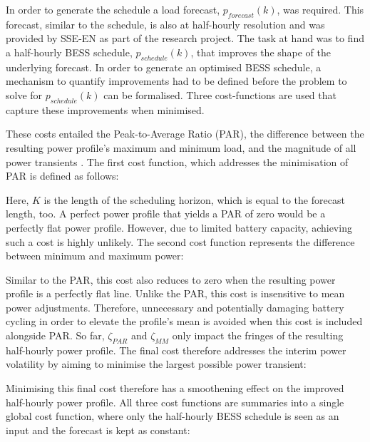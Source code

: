 In order to generate the schedule a load forecast, $p_{forecast}(k)$, was required.
This forecast, similar to the schedule, is also at half-hourly resolution and was provided by SSE-EN as part of the research project.
The task at hand was to find a half-hourly BESS schedule, $p_{schedule}(k)$, that improves the shape of the underlying forecast.
In order to generate an optimised BESS schedule, a mechanism to quantify improvements had to be defined before the problem to solve for $p_{schedule}(k)$ can be formalised.
Three cost-functions are used that capture these improvements when minimised.

These costs entailed the Peak-to-Average Ratio (PAR), the difference between the resulting power profile's maximum and minimum load, and the magnitude of all power transients \cite{Mohsenian-Rad2010, Mostafa2016}.
The first cost function, which addresses the minimisation of PAR is defined as follows:



Here, $K$ is the length of the scheduling horizon, which is equal to the forecast length, too.
A perfect power profile that yields a PAR of zero would be a perfectly flat power profile.
However, due to limited battery capacity, achieving such a cost is highly unlikely.
The second cost function represents the difference between minimum and maximum power:



Similar to the PAR, this cost also reduces to zero when the resulting power profile is a perfectly flat line.
Unlike the PAR, this cost is insensitive to mean power adjustments.
Therefore, unnecessary and potentially damaging battery cycling in order to elevate the profile's mean is avoided when this cost is included alongside PAR.
So far, $\zeta_{PAR}$ and $\zeta_{MM}$ only impact the fringes of the resulting half-hourly power profile.
The final cost therefore addresses the interim power volatility by aiming to minimise the largest possible power transient:



Minimising this final cost therefore has a smoothening effect on the improved half-hourly power profile.
All three cost functions are summaries into a single global cost function, where only the half-hourly BESS schedule is seen as an input and the forecast is kept as constant:




